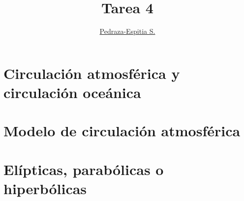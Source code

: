 \documentclass{article}
\title{Tarea 4}
\author{\href{https://git.io/salvador}{Pedraza-Espitia S.}}
\date{}
\begin{document}
\maketitle

\section{Circulación atmosférica y circulación oceánica}

\section{Modelo de circulación atmosférica}

\section{Elípticas, parabólicas o hiperbólicas}


%
%
\end{document}
